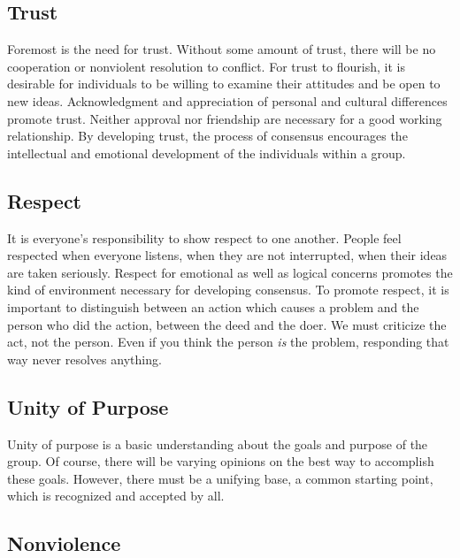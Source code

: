 \subsection*{Trust}

Foremost is the need for trust. Without some amount of trust, there will be no cooperation or nonviolent resolution to conflict. For trust to flourish, it is desirable for individuals to be willing to examine their attitudes and be open to new ideas. Acknowledgment and appreciation of personal and cultural differences promote trust. Neither approval nor friendship are necessary for a good working relationship. By developing trust, the process of consensus encourages the intellectual and emotional development of the individuals within a group.

\subsection*{Respect}

It is everyone's responsibility to show respect to one another. People feel respected when everyone listens, when they are not interrupted, when their ideas are taken seriously. Respect for emotional as well as logical concerns promotes the kind of environment necessary for developing consensus. To promote respect, it is important to distinguish between an action which causes a problem and the person who did the action, between the deed and the doer. We must criticize the act, not the person. Even if you think the person \emph{is} the problem, responding that way never resolves anything.%

\subsection*{Unity of Purpose}

Unity of purpose is a basic understanding about the goals and purpose of the group. Of course, there will be varying opinions on the best way to accomplish these goals. However, there must be a unifying base, a common starting point, which is recognized and accepted by all.

\subsection*{Nonviolence}

